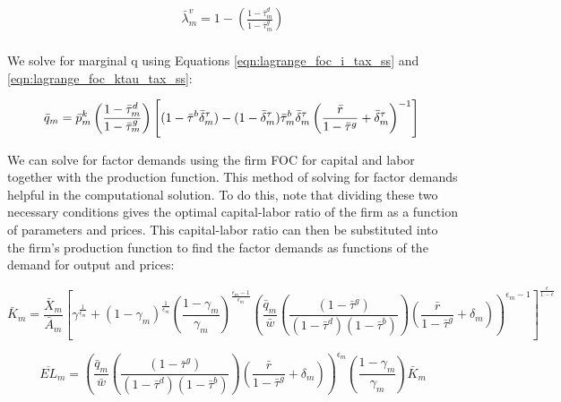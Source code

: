 \documentclass[letterpaper,12pt]{article}
\theoremstyle{definition}
\begin{document}
\begin{spacing}{1.5}
\begin{equation}
\label{eqn:lagrange_foc_vn_tax2_ss}
\begin{split}
 \bar{\lambda}^{v}_{m} = 1 - \left(\frac{1-\bar{\tau}^{d}_{m}}{1-\bar{\tau}^{g}_{m}}\right)   \\
\end{split}
\end{equation}


We solve for marginal q using Equations \ref{eqn:lagrange_foc_i_tax_ss} and \ref{eqn:lagrange_foc_ktau_tax_ss}:

\begin{equation}
\label{eqn:q_tax_ss}
 \bar{q}_{m} = \bar{p}^{k}_{m}\left(\frac{1-\bar{\tau}^{d}_{m}}{1-\bar{\tau}^{g}_{m}}\right)\left[(1-\bar{\tau}^{b}\bar{\delta}^{\tau}_{m}) - (1-\bar{\delta}^{\tau}_{m})\bar{\tau}^{b}_{m}\bar{\delta}^{\tau}_{m}\left(\frac{\bar{r}}{1-\bar{\tau}^{g}}+\bar{\delta}^{\tau}_{m}\right)^{-1} \right]  \\
\end{equation}


We can solve for factor demands using the firm FOC for capital and labor together with the production function.  This method of solving for factor demands helpful in the computational solution.  To do this, note that dividing these two necessary conditions gives the optimal capital-labor ratio of the firm as a function of parameters and prices.  This capital-labor ratio can then be substituted into the firm's production function to find the factor demands as functions of the demand for output and prices: 

\begin{equation}
\label{eqn:k_demand_tax_ss}
\bar{K}_{m} = \frac{\bar{X}_{m}}{\bar{A}_{m}}\left[\gamma^{\frac{1}{\epsilon_{m}}} + (1-\gamma_{m})^{\frac{1}{\epsilon_{m}}}\left(\frac{1-\gamma_{m}}{\gamma_{m}}\right)^{\frac{\epsilon_{m}-1}{\epsilon_{m}}}\left(\frac{\bar{q}_{m}}{\bar{w}}\left(\frac{(1-\bar{\tau}^{g})}{(1-\bar{\tau}^{d})(1-\bar{\tau}^{b})}\right)\left(\frac{\bar{r}}{1-\bar{\tau}^{g}}+\delta_{m}\right)\right)^{\epsilon_{m}-1} \right]^{\frac{\epsilon}{1-\epsilon}}
\end{equation}

\begin{equation}
\label{eqn:l_demand_tax_ss}
\overline{EL}_{m} = \left(\frac{\bar{q}_{m}}{\bar{w}}\left(\frac{(1-\bar{\tau}^{g})}{(1-\bar{\tau}^{d})(1-\bar{\tau}^{b})}\right)\left(\frac{\bar{r}}{1-\bar{\tau}^{g}}+\delta_{m}\right)\right)^{\epsilon_{m}}\left(\frac{1-\gamma_{m}}{\gamma_{m}}\right)\bar{K}_{m} 
\end{equation}




\end{spacing}
\end{document}
